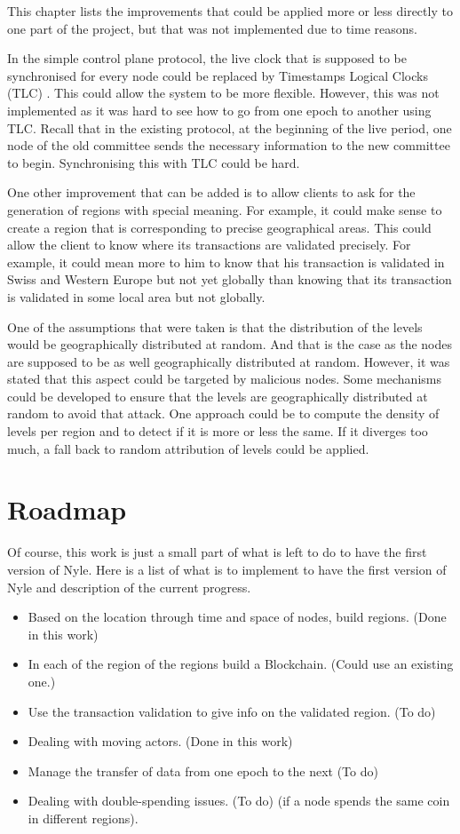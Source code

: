 \documentclass[a4paper,11pt,oneside]{report}
\begin{document}
This chapter lists the improvements that could be applied more or less directly
to one part of the project, but that was not implemented due to time reasons. 

In the simple control plane protocol, the live clock that is supposed to be
synchronised for every node could be replaced by Timestamps Logical Clocks (TLC)
\cite{Ford2019}. This could allow the system to be more flexible.
However, this was not implemented as it was hard to see how to go from one
epoch to another using TLC. Recall that in the existing protocol, at the
beginning of the live period, one node of the old committee sends the necessary
information to the new committee to begin. Synchronising this with TLC could be hard.

One other improvement that can be added is to allow clients to ask for the
generation of regions with special meaning. For example, it could make sense to
create a region that is corresponding to precise geographical areas. This could
allow the client to know where its transactions are validated precisely. For
example, it could mean more to him to know that his transaction is validated in
Swiss and Western Europe but not yet globally than knowing that its transaction
is validated in some local area but not globally. 

One of the assumptions that were taken is that the distribution of the levels
would be geographically distributed at random. And that is the case as the
nodes are supposed to be as well geographically distributed at random.
However, it was stated that this aspect could be targeted by malicious nodes.
 Some mechanisms could be developed to ensure
that the levels are geographically distributed at random to avoid that attack. One approach could be
to compute the density of levels per region and to detect if it is more or less
the same. If it diverges too much, a fall back to random attribution of levels
could be applied. 

\section{Roadmap}
Of course, this work is just a small part of what is left to do to have the first
version of Nyle. Here is a list of what is to implement to have the first version
of Nyle and description of the current progress.

\begin{itemize} 
\item Based on the location through time and space of nodes, build regions.
(Done in this work)
\item In each of the region of the regions build a Blockchain. (Could use an
 existing one.)
\item Use the transaction validation to give info on the validated region. (To
do) 
\item Dealing with moving actors. (Done in this work)
\item Manage the transfer of data from one epoch to the next (To do)
\item Dealing with double-spending issues. (To do)
(if a node spends the same coin in different regions). 
\end{itemize}
\end{document}
